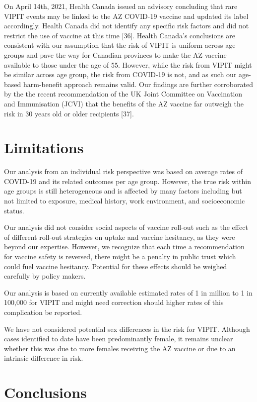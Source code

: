 \documentclass[]{elsarticle} %
\begin{document}
On April 14th, 2021, Health Canada issued an advisory concluding that
rare VIPIT events may be linked to the AZ COVID-19 vaccine and updated
its label accordingly. Health Canada did not identify any specific risk
factors and did not restrict the use of vaccine at this time {[}36{]}.
Health Canada's conclusions are consistent with our assumption that the
risk of VIPIT is uniform across age groups and pave the way for Canadian
provinces to make the AZ vaccine available to those under the age of 55.
However, while the risk from VIPIT might be similar across age group,
the risk from COVID-19 is not, and as such our age-based harm-benefit
approach remains valid. Our findings are further corroborated by the the
recent recommendation of the UK Joint Committee on Vaccination and
Immunisation (JCVI) that the benefits of the AZ vaccine far outweigh the
risk in 30 years old or older recipients {[}37{]}.

\hypertarget{limitations}{%
\section{Limitations}\label{limitations}}

Our analysis from an individual risk perspective was based on average
rates of COVID-19 and its related outcomes per age group. However, the
true risk within age groups is still heterogeneous and is affected by
many factors including but not limited to exposure, medical history,
work environment, and socioeconomic status.

Our analysis did not consider social aspects of vaccine roll-out such as
the effect of different roll-out strategies on uptake and vaccine
hesitancy, as they were beyond our expertise. However, we recognize that
each time a recommendation for vaccine safety is reversed, there might
be a penalty in public trust which could fuel vaccine hesitancy.
Potential for these effects should be weighed carefully by policy
makers.

Our analysis is based on currently available estimated rates of 1 in
million to 1 in 100,000 for VIPIT and might need correction should
higher rates of this complication be reported.

We have not considered potential sex differences in the risk for VIPIT.
Although cases identified to date have been predominantly female, it
remains unclear whether this was due to more females receiving the AZ
vaccine or due to an intrinsic difference in risk.

\hypertarget{conclusions}{%
\section{Conclusions}\label{conclusions}}
\end{document}
